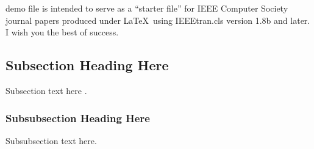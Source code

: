  demo file is intended to serve as a ``starter file''
for IEEE Computer Society journal papers produced under \LaTeX\ using
IEEEtran.cls version 1.8b and later. I wish you the best of success.

\subsection{Subsection Heading Here}
Subsection text here \cite{Hsiao.2013}.

\subsubsection{Subsubsection Heading Here}
Subsubsection text here.
